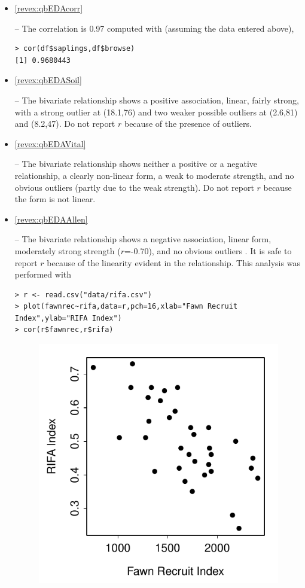 \documentclass[10pt,openany]{book}\usepackage[]{graphicx}\usepackage[]{color}
\makeatletter
\newenvironment{kframe}{%
 \def\at@end@of@kframe{}%
 \ifinner\ifhmode%
  \def\at@end@of@kframe{\end{minipage}}%
  \begin{minipage}{\columnwidth}%
 \fi\fi%
 \def\FrameCommand##1{\hskip\@totalleftmargin \hskip-\fboxsep
 \colorbox{shadecolor}{##1}\hskip-\fboxsep
     \hskip-\linewidth \hskip-\@totalleftmargin \hskip\columnwidth}%
 \MakeFramed {\advance\hsize-\width
   \@totalleftmargin\z@ \linewidth\hsize
   \@setminipage}}%
 {\par\unskip\endMakeFramed%
 \at@end@of@kframe}
\newenvironment{knitrout}{}{} %
\makeatother
\begin{document}
\begin{itemize}
  \item \hypertarget{ans:qbEDAcorr}{\ref{revex:qbEDAcorr}} -- The correlation is 0.97 computed with (assuming the data entered above),
\begin{knitrout}
\color{fgcolor}\begin{kframe}
\begin{verbatim}
> cor(df$saplings,df$browse)
[1] 0.9680443
\end{verbatim}
\end{kframe}
\end{knitrout}

  \item \hypertarget{ans:qbEDASoil}{\ref{revex:qbEDASoil}} -- The bivariate relationship shows a positive association, linear, fairly strong, with a strong outlier at (18.1,76) and two weaker possible outliers at (2.6,81) and (8.2,47).  Do not report $r$ because of the presence of outliers.
  \item \hypertarget{ans:qbEDAVital}{\ref{revex:qbEDAVital}} -- The bivariate relationship shows neither a positive or a negative relationship, a clearly non-linear form, a weak to moderate strength, and no obvious outliers (partly due to the weak strength).  Do not report $r$ because the form is not linear.

  \item \hypertarget{ans:qbEDAAllen}{\ref{revex:qbEDAAllen}} -- The bivariate relationship shows a negative association, linear form, moderately strong strength ($r$=-0.70), and no obvious outliers .  It is safe to report $r$ because of the linearity evident in the relationship.  This analysis was performed with
\begin{knitrout}
\color{fgcolor}\begin{kframe}
\begin{verbatim}
> r <- read.csv("data/rifa.csv")
> plot(fawnrec~rifa,data=r,pch=16,xlab="Fawn Recruit Index",ylab="RIFA Index")
> cor(r$fawnrec,r$rifa)
\end{verbatim}
\end{kframe}\begin{figure}[hbtp]

{\centering \includegraphics[width=.4\linewidth]{Figs/ScatRIFA-1} 

}
\end{figure}
\end{knitrout}
\end{itemize}
\end{document}
